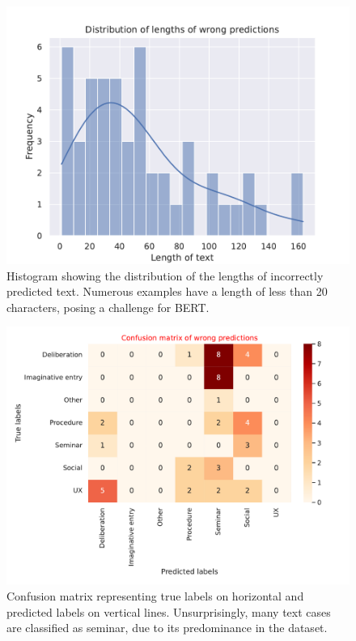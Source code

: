 \documentclass[fleqn,moreauthors,10pt]{ds_report}
\begin{document}
\begin{figure}[ht!]\centering
	\includegraphics[scale=0.5]{fig/wrong_predictions_length_distribution.pdf}
	\caption{Histogram showing the distribution of the lengths of incorrectly predicted text. Numerous examples have a length of less than 20 characters, posing a challenge for BERT.}
	\label{fig:wrong_pred_len}
\end{figure}


\begin{figure}[]\centering
	\includegraphics[scale=0.4]{fig/confusion_matrix_wrong_predictions.pdf}
	\caption{Confusion matrix representing true labels on horizontal and predicted labels on vertical lines. Unsurprisingly, many text cases are classified as seminar, due to its predominance in the dataset. }
	\label{fig:confusion_matr}
\end{figure}
\end{document}
